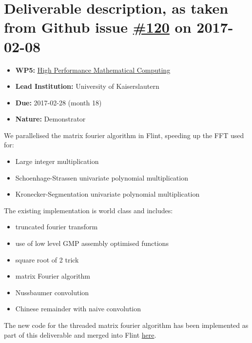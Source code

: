 \section*{\texorpdfstring{Deliverable description, as taken from Github
issue
\href{https://github.com/OpenDreamKit/OpenDreamKit/issues/120}{\#120} on
2017-02-08}{Deliverable description, as taken from Github issue \#120 on 2017-02-08}}\label{deliverable-description-as-taken-from-github-issue-120-on-2017-02-08}

\begin{itemize}
\tightlist
\item
  \textbf{WP5:}
  \href{https://github.com/OpenDreamKit/OpenDreamKit/tree/master/WP5}{High
  Performance Mathematical Computing}
\item
  \textbf{Lead Institution:} University of Kaiserslautern
\item
  \textbf{Due:} 2017-02-28 (month 18)
\item
  \textbf{Nature:} Demonstrator
\end{itemize}

We parallelised the matrix fourier algorithm in Flint, speeding up the
FFT used for:

\begin{itemize}
\tightlist
\item
  Large integer multiplication
\item
  Schoenhage-Strassen univariate polynomial multiplication
\item
  Kronecker-Segmentation univariate polynomial multiplication
\end{itemize}

The existing implementation is world class and includes:

\begin{itemize}
\tightlist
\item
  truncated fourier transform
\item
  use of low level GMP assembly optimised functions
\item
  square root of 2 trick
\item
  matrix Fourier algorithm
\item
  Nussbaumer convolution
\item
  Chinese remainder with naive convolution
\end{itemize}

The new code for the threaded matrix fourier algorithm has been
implemented as part of this deliverable and merged into Flint
\href{https://github.com/wbhart/flint2/tree/trunk/fft}{here}.


